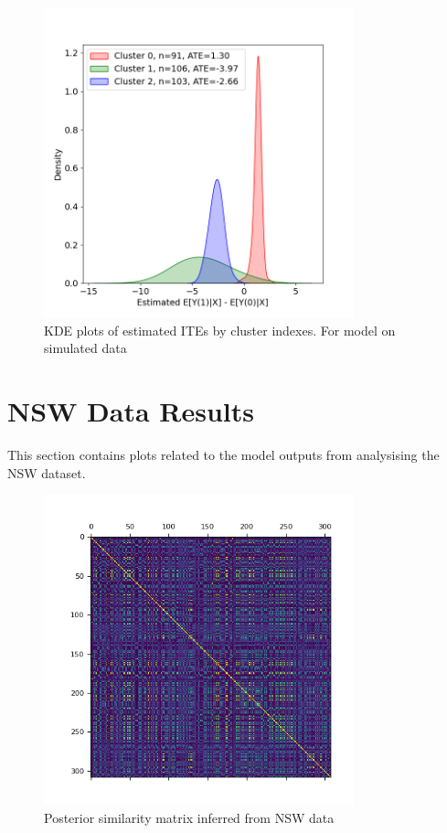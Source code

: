 \documentclass{article}
\begin{document}
\begin{figure}[H]
  \centering
  \includegraphics[width=0.8\textwidth]{Plots/Simulated_output_histogram.png}
  \caption{KDE plots of estimated ITEs by cluster indexes. For model on simulated data}
  \label{fig:sim_histo}
\end{figure}


\section{NSW Data Results}
This section contains plots related to the model outputs from analysising the NSW dataset.
\begin{figure}[H]
  \centering
  \includegraphics[width=0.8\textwidth]{Plots/NSW Posterior Similarity Matrix.png}
  \caption{Posterior similarity matrix inferred from NSW data}
  \label{fig:nsw_post_mat}
\end{figure}
\end{document}
